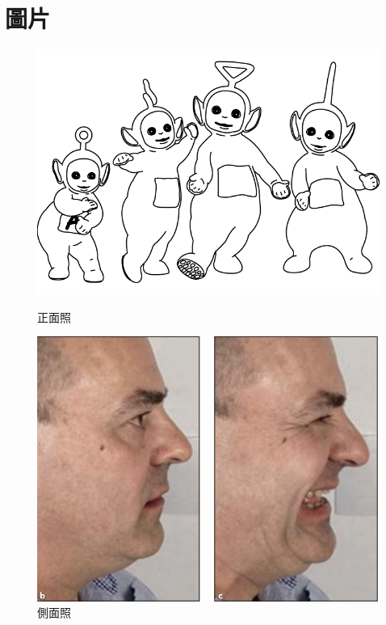 \section{圖片}
\begin{figure}[H]
  \centering
  \begin{minipage}[b]{0.4\textwidth} %
  \centering
  \includegraphics[width=1\textwidth]{a.png}
  \caption{正面照}
  \label{fig:正面}
  \end{minipage}
  \begin{minipage}[b]{0.4\textwidth} %
  \centering
  \includegraphics[width=1\textwidth]{paste_src/2023-02-07-20-50-39.png}
  \caption{側面照}
  \label{fig:側面}
  \end{minipage}
  \end{figure}
  
